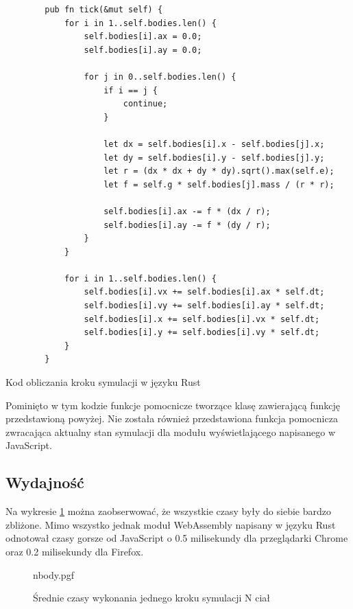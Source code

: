 \documentclass[language=polish,type=master]{aghmodern}
\begin{document}
\begin{listing}[H]
    \begin{verbatim}
        pub fn tick(&mut self) {
            for i in 1..self.bodies.len() {
                self.bodies[i].ax = 0.0;
                self.bodies[i].ay = 0.0;
    
                for j in 0..self.bodies.len() {
                    if i == j {
                        continue;
                    }
    
                    let dx = self.bodies[i].x - self.bodies[j].x;
                    let dy = self.bodies[i].y - self.bodies[j].y;
                    let r = (dx * dx + dy * dy).sqrt().max(self.e);
                    let f = self.g * self.bodies[j].mass / (r * r);
    
                    self.bodies[i].ax -= f * (dx / r);
                    self.bodies[i].ay -= f * (dy / r);
                }
            }
    
            for i in 1..self.bodies.len() {
                self.bodies[i].vx += self.bodies[i].ax * self.dt;
                self.bodies[i].vy += self.bodies[i].ay * self.dt;
                self.bodies[i].x += self.bodies[i].vx * self.dt;
                self.bodies[i].y += self.bodies[i].vy * self.dt;
            }
        }
    \end{verbatim}
    \caption{Kod obliczania kroku symulacji w języku Rust}
\end{listing}

Pominięto w tym kodzie funkcje pomocnicze tworzące klasę zawierającą funkcję przedstawioną powyżej.
Nie została również przedstawiona funkcja pomocnicza zwracająca aktualny stan symulacji dla modułu wyświetlającego napisanego w JavaScript.

\subsection{Wydajność}
Na wykresie \ref{fig:nbody} można zaobserwować, że wszystkie czasy były do siebie bardzo zbliżone.
Mimo wszystko jednak moduł WebAssembly napisany w języku Rust odnotował czasy gorsze od JavaScript o 0.5 milisekundy dla przeglądarki Chrome oraz 0.2 milisekundy dla Firefox.

\begin{figure}[H]
    \centering
    {nbody.pgf}
    \caption{Średnie czasy wykonania jednego kroku symulacji N ciał}
    \label{fig:nbody}
\end{figure}
\end{document}
